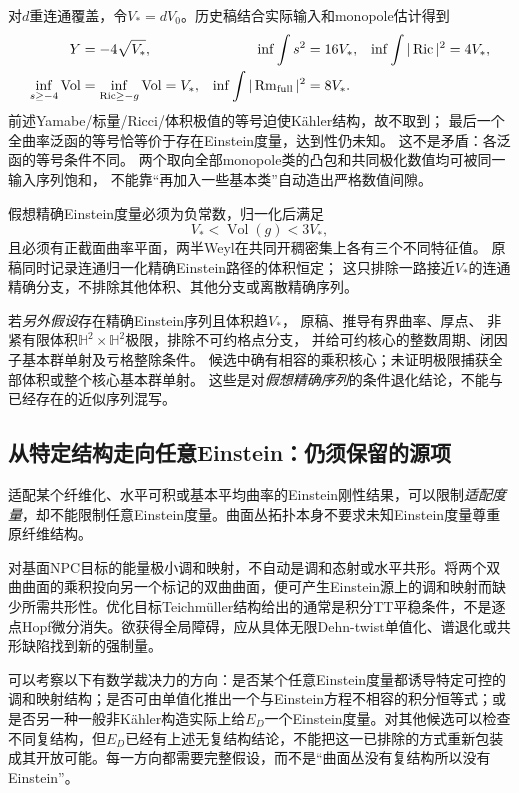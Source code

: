 \documentclass[UTF8,a4paper,11pt,fontset=fandol]{ctexart}
\numberwithin{equation}{section}
\theoremstyle{definition}
\newcommand{\Ric}{\operatorname{Ric}}
\newcommand{\Rm}{\operatorname{Rm}}
\newcommand{\Vol}{\operatorname{Vol}}
\begin{document}
对$d$重连通覆盖，令$V_*=dV_0$。历史稿结合实际输入和monopole估计得到
\begin{align}
 Y&=-4\sqrt{V_*},&
 \inf\int s^2&=16V_*,&\inf\int|\Ric|^2&=4V_*,\notag\\
 \inf_{s\ge-4}\Vol&=\inf_{\Ric\ge-g}\Vol=V_*,&
 \inf\int|\Rm_{\rm full}|^2&=8V_* .\label{eq:bundlefunctionals}
\end{align}
前述Yamabe/标量/Ricci/体积极值的等号迫使Kähler结构，故不取到；
最后一个全曲率泛函的等号恰等价于存在Einstein度量，达到性仍未知。
这不是矛盾：各泛函的等号条件不同。
两个取向全部monopole类的凸包和共同极化数值均可被同一输入序列饱和，
不能靠“再加入一些基本类”自动造出严格数值间隙。

假想精确Einstein度量必须为负常数，归一化后满足
\[
 V_*<\Vol(g)<3V_*,
\]
且必须有正截面曲率平面，两半Weyl在共同开稠密集上各有三个不同特征值。
原稿同时记录连通归一化精确Einstein路径的体积恒定；
这只排除一路接近$V_*$的连通精确分支，不排除其他体积、其他分支或离散精确序列。

若\emph{另外假设}存在精确Einstein序列且体积趋$V_*$，
原稿、推导有界曲率、厚点、
非紧有限体积$\mathbb H^2\times\mathbb H^2$极限，排除不可约格点分支，
并给可约核心的整数周期、闭因子基本群单射及亏格整除条件。
候选中确有相容的乘积核心；未证明极限捕获全部体积或整个核心基本群单射。
这些是对\emph{假想精确序列}的条件退化结论，不能与已经存在的近似序列混写。

\subsection{从特定结构走向任意Einstein：仍须保留的源项}

适配某个纤维化、水平可积或基本平均曲率的Einstein刚性结果，可以限制\emph{适配度量}，却不能限制任意Einstein度量。曲面丛拓扑本身不要求未知Einstein度量尊重原纤维结构。

对基面NPC目标的能量极小调和映射，不自动是调和态射或水平共形。将两个双曲曲面的乘积投向另一个标记的双曲曲面，便可产生Einstein源上的调和映射而缺少所需共形性。优化目标Teichm\"uller结构给出的通常是积分TT平稳条件，不是逐点Hopf微分消失。欲获得全局障碍，应从具体无限Dehn-twist单值化、谱退化或共形缺陷找到新的强制量。

可以考察以下有数学裁决力的方向：是否某个任意Einstein度量都诱导特定可控的调和映射结构；是否可由单值化推出一个与Einstein方程不相容的积分恒等式；或是否另一种一般非Kähler构造实际上给$E_D$一个Einstein度量。对其他候选可以检查不同复结构，但$E_D$已经有上述无复结构结论，不能把这一已排除的方式重新包装成其开放可能。每一方向都需要完整假设，而不是“曲面丛没有复结构所以没有Einstein”。
\end{document}
